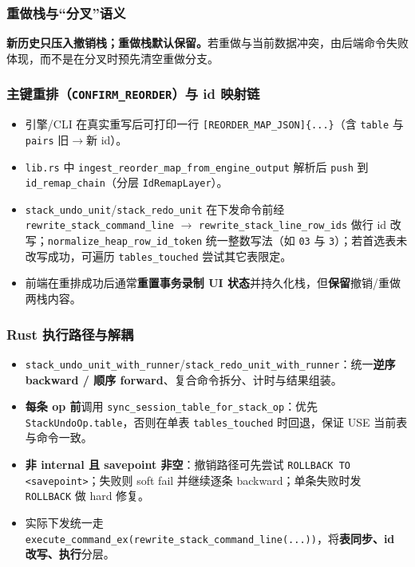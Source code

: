 \subsubsection{重做栈与“分叉”语义}

\textbf{新历史只压入撤销栈；重做栈默认保留。}若重做与当前数据冲突，由后端命令失败体现，而不是在分叉时预先清空重做分支。

\subsubsection{主键重排（\texttt{CONFIRM\_REORDER}）与 id 映射链}

\begin{itemize}
  \item 引擎/CLI 在真实重写后可打印一行 \texttt{[REORDER\_MAP\_JSON]\{...\}}（含 \texttt{table} 与 \texttt{pairs} 旧$\rightarrow$新 id）。
  \item \texttt{lib.rs} 中 \texttt{ingest\_reorder\_map\_from\_engine\_output} 解析后 \texttt{push} 到 \texttt{id\_remap\_chain}（分层 \texttt{IdRemapLayer}）。
  \item \texttt{stack\_undo\_unit}/\texttt{stack\_redo\_unit} 在下发命令前经 \texttt{rewrite\_stack\_command\_line} $\rightarrow$ \texttt{rewrite\_stack\_line\_row\_ids} 做行 id 改写；\texttt{normalize\_heap\_row\_id\_token} 统一整数写法（如 \texttt{03} 与 \texttt{3}）；若首选表未改写成功，可遍历 \texttt{tables\_touched} 尝试其它表限定。
  \item 前端在重排成功后通常\textbf{重置事务录制 UI 状态}并持久化栈，但\textbf{保留}撤销/重做两栈内容。
\end{itemize}

\subsubsection{Rust 执行路径与解耦}

\begin{itemize}
  \item \texttt{stack\_undo\_unit\_with\_runner}/\texttt{stack\_redo\_unit\_with\_runner}：统一\textbf{逆序 backward / 顺序 forward}、复合命令拆分、计时与结果组装。
  \item \textbf{每条 op 前}调用 \texttt{sync\_session\_table\_for\_stack\_op}：优先 \texttt{StackUndoOp.table}，否则在单表 \texttt{tables\_touched} 时回退，保证 USE 当前表与命令一致。
  \item \textbf{非 internal 且 savepoint 非空}：撤销路径可先尝试 \texttt{ROLLBACK TO <savepoint>}；失败则 soft fail 并继续逐条 backward；单条失败时发 \texttt{ROLLBACK} 做 hard 修复。
  \item 实际下发统一走 \texttt{execute\_command\_ex(rewrite\_stack\_command\_line(...))}，将\textbf{表同步、id 改写、执行}分层。
\end{itemize}

